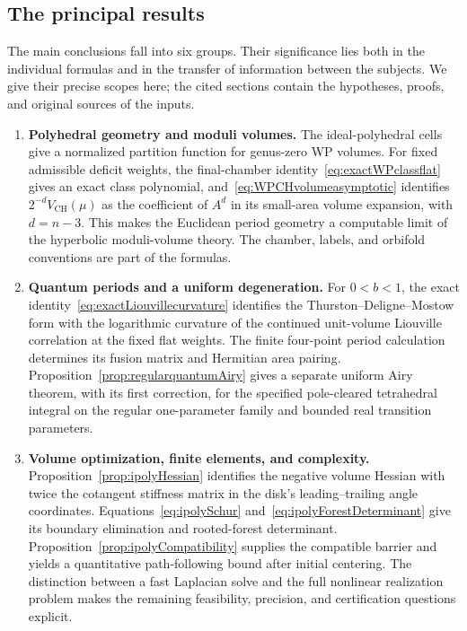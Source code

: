 \documentclass[11pt,a4paper]{article}
\numberwithin{equation}{section}
\theoremstyle{definition}
\theoremstyle{remark}
\begin{document}
\subsection*{The principal results}

The main conclusions fall into six groups. Their significance lies both
in the individual formulas and in the transfer of information between
the subjects. We give their precise scopes here; the cited sections
contain the hypotheses, proofs, and original sources of the inputs.

\begin{enumerate}[leftmargin=*,label=\textbf{\arabic*.}]
\item \textbf{Polyhedral geometry and moduli volumes.}
The ideal-polyhedral cells give a normalized partition function for
genus-zero WP volumes. For fixed admissible deficit weights, the
final-chamber identity~\eqref{eq:exactWPclassflat} gives an exact class
polynomial, and~\eqref{eq:WPCHvolumeasymptotic} identifies
$2^{-d}V_{\mathrm{CH}}(\mu)$ as the coefficient of $A^d$ in its
small-area volume expansion, with $d=n-3$. This makes
the Euclidean period geometry a computable limit of the hyperbolic
moduli-volume theory. The chamber, labels, and orbifold conventions are
part of the formulas.

\item \textbf{Quantum periods and a uniform degeneration.}
For $0<b<1$, the exact identity~\eqref{eq:exactLiouvillecurvature}
identifies the Thurston--Deligne--Mostow form with the logarithmic
curvature of the continued unit-volume Liouville correlation at the
fixed flat weights. The finite four-point period calculation determines
its fusion matrix and Hermitian area pairing.
Proposition~\ref{prop:regularquantumAiry} gives a separate uniform
Airy theorem, with its first correction, for the specified pole-cleared
tetrahedral integral on the regular one-parameter family and bounded
real transition parameters.

\item \textbf{Volume optimization, finite elements, and complexity.}
Proposition~\ref{prop:ipolyHessian} identifies the negative volume
Hessian with twice the cotangent stiffness matrix in the disk's
leading--trailing angle coordinates. Equations~\eqref{eq:ipolySchur}
and~\eqref{eq:ipolyForestDeterminant} give its boundary elimination and
rooted-forest determinant. Proposition~\ref{prop:ipolyCompatibility}
supplies the compatible barrier and yields a quantitative path-following
bound after initial centering. The distinction between a fast Laplacian
solve and the full nonlinear realization problem makes the remaining
feasibility, precision, and certification questions explicit.


\end{enumerate}
\end{document}
